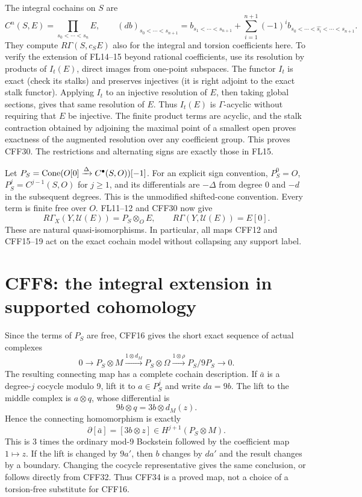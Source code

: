 The integral cochains on \(S\) are
\[
 C^n(S,E)=\prod_{s_0<\cdots<s_n}E,\qquad
 (db)_{s_0<\cdots<s_{n+1}}
 =b_{s_1<\cdots<s_{n+1}}+
   \sum_{i=1}^{n+1}(-1)^i
     b_{s_0<\cdots<\widehat{s_i}<\cdots<s_{n+1}}.
 \tag{CFF30}
\]
They compute \(R\Gamma(S,c_SE)\) also for the integral
and torsion coefficients here. To verify the extension
of FL14--15 beyond rational coefficients, use its
resolution by products of \(I_t(E)\), direct images
from one-point subspaces. The functor \(I_t\) is exact
(check its stalks) and preserves injectives (it is right
adjoint to the exact stalk functor). Applying \(I_t\)
to an injective resolution of \(E\), then taking global
sections, gives that same resolution of \(E\).
Thus \(I_t(E)\) is \(\Gamma\)-acyclic without requiring
that \(E\) be injective. The finite product terms are
acyclic, and the stalk contraction obtained by adjoining
the maximal point of a smallest open proves exactness
of the augmented resolution over any coefficient group.
This proves CFF30. The restrictions and alternating
signs are exactly those in FL15.

Let \(P_S=\operatorname{Cone}(O[0]\xrightarrow{\Delta}C^\bullet(S,O))[-1]\).
For an explicit sign convention, \(P_S^0=O\),
\(P_S^j=C^{j-1}(S,O)\) for \(j\ge1\), and its
differentials are \(-\Delta\) from degree 0 and
\(-d\) in the subsequent degrees. This is the
unmodified shifted-cone convention. Every term is
finite free over \(O\). FL11--12 and CFF30 now give
\[
 R\Gamma_X(Y,\mathcal U(E))=P_S\otimes_O E,\qquad
 R\Gamma(Y,\mathcal U(E))=E[0].
 \tag{CFF31}
\]
These are natural quasi-isomorphisms. In particular,
all maps CFF12 and CFF15--19 act on the exact cochain
model without collapsing any support label.

\section{CFF8: the integral extension in supported cohomology}
Since the terms of \(P_S\) are free, CFF16 gives the
short exact sequence of actual complexes
\[
 0\longrightarrow P_S\otimes M
 \xrightarrow{1\otimes d_M}P_S\otimes\Omega
 \xrightarrow{1\otimes\rho}P_S/9P_S\longrightarrow0 .
 \tag{CFF32}
\]
The resulting connecting map has a complete cochain
description. If \(\bar a\) is a degree-\(j\) cocycle
modulo 9, lift it to \(a\in P_S^j\) and write
\(d a=9b\). The lift to the middle complex is
\(a\otimes q\), whose differential is
\[
 9b\otimes q=3b\otimes d_M(z).
 \tag{CFF33}
\]
Hence the connecting homomorphism is exactly
\[
 \partial[\bar a]=[3b\otimes z]
       \in H^{j+1}(P_S\otimes M).
 \tag{CFF34}
\]
This is 3 times the ordinary mod-9 Bockstein followed
by the coefficient map \(1\mapsto z\). If the lift is
changed by \(9a'\), then \(b\) changes by \(da'\) and
the result changes by a boundary. Changing the cocycle
representative gives the same conclusion, or follows
directly from CFF32. Thus CFF34 is a proved map,
not a choice of a torsion-free substitute for CFF16.

